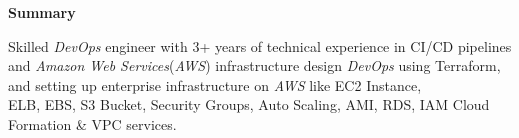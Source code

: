 \documentclass[10pt,A4]{article}
\newcommand{\cvsection}[1]
{
	\begin{center}
		\large\textcolor{sectcol}{\textbf{#1}}
	\end{center}
}
\begin{document}
\vspace{-6pt}
\cvsection{Summary}
Skilled \emph{DevOps} engineer with 3+ years of technical experience in CI/CD pipelines and \emph{Amazon Web Services}(\emph{AWS}) infrastructure design \emph{DevOps} using Terraform, and setting up enterprise infrastructure on \emph{AWS} like EC2 Instance,\\ ELB, EBS, S3 Bucket, Security Groups, Auto Scaling, AMI, RDS, IAM Cloud Formation & VPC services.\\
\end{document}
